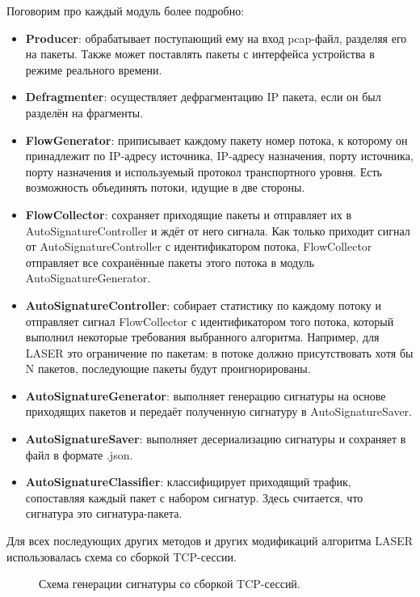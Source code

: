 Поговорим про каждый модуль более подробно:

\begin{itemize}
    \item \textbf{Producer}: обрабатывает поступающий ему на вход pcap-файл, разделяя его на пакеты.
    Также может поставлять пакеты с интерфейса устройства в режиме реального времени.
    \item \textbf{Defragmenter}: осуществляет дефрагментацию IP пакета, если он был разделён на фрагменты.
    \item \textbf{FlowGenerator}: приписывает каждому пакету номер потока, к которому он принадлежит по
    IP-адресу источника, IP-адресу назначения, порту источника, порту назначения и используемый протокол транспортного уровня. Есть возможность объединять потоки, идущие в две стороны.
    \item \textbf{FlowCollector}: сохраняет приходящие пакеты и отправляет их в AutoSignatureController и ждёт от него сигнала.
    Как только приходит сигнал от AutoSignatureController с идентификатором потока, FlowCollector отправляет все сохранённые пакеты этого потока в модуль AutoSignatureGenerator.
    \item \textbf{AutoSignatureController}: собирает статистику по каждому потоку и отправляет сигнал FlowCollector с идентификатором того потока,
    который выполнил некоторые требования выбранного алгоритма.
    Например, для LASER это ограничение по пакетам: в потоке должно присутствовать хотя бы N пакетов, последующие пакеты будут проигнорированы.
    \item \textbf{AutoSignatureGenerator}: выполняет генерацию сигнатуры на основе приходящих пакетов и передаёт полученную сигнатуру в AutoSignatureSaver.
    \item \textbf{AutoSignatureSaver}: выполняет десериализацию сигнатуры и сохраняет в файл в формате .json.
    \item \textbf{AutoSignatureClassifier}: классифицирует приходящий трафик, сопоставляя каждый пакет с набором сигнатур. Здесь считается, что сигнатура это сигнатура-пакета.
\end{itemize}

Для всех последующих других методов и других модификаций алгоритма LASER использовалась схема со сборкой TCP-сессии.

\begin{figure}[H]
    \begin{center}
        
        \caption{Схема генерации сигнатуры со сборкой TCP-сессий.}
    \end{center}
\end{figure}

